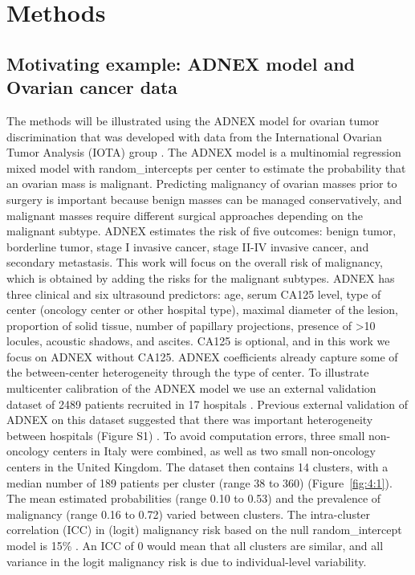 \section{Methods}
\subsection{\texorpdfstring{Motivating example: ADNEX model and Ovarian cancer data}{Motivating example: ADNEX model and Ovarian cancer data}}
The methods will be illustrated using the \gls{ADNEX} model for ovarian tumor discrimination that was developed with data from the International Ovarian Tumor Analysis (\gls{IOTA}) group \cite{vancalsterEvaluatingRiskOvarian2014,timmerman2024}. The \gls{ADNEX} model is a multinomial regression mixed model with \glspl{random_intercept} per center to estimate the probability that an ovarian mass is malignant. Predicting malignancy of ovarian masses prior to surgery is important because benign masses can be managed conservatively, and malignant masses require different surgical approaches depending on the malignant subtype. \gls{ADNEX} estimates the risk of five outcomes: benign tumor, borderline tumor, stage I invasive cancer, stage II-IV invasive cancer, and secondary metastasis. This work will focus on the overall risk of malignancy, which is obtained by adding the risks for the malignant subtypes. \gls{ADNEX} has three clinical and six ultrasound predictors: age, serum \gls{CA125} level, type of center (oncology center or other hospital type), maximal diameter of the lesion, proportion of solid tissue, number of papillary projections, presence of \textgreater10 locules, acoustic shadows, and ascites. \gls{CA125} is optional, and in this work we focus on \gls{ADNEX} without \gls{CA125}. \gls{ADNEX} coefficients already capture some of the between-center heterogeneity through the type of center. To illustrate multicenter calibration of the \gls{ADNEX} model we use an external validation dataset of 2489 patients recruited in 17 hospitals \cite{kaijserEvidencebasedApproachDiagnosis2015}. Previous external validation of \gls{ADNEX} on this dataset suggested that there was important heterogeneity between hospitals (Figure S1) \cite{vancalsterValidationModelsDiagnose2020}. To avoid computation errors, three small non-oncology centers in Italy were combined, as well as two small non-oncology centers in the United Kingdom. The dataset then contains 14 clusters, with a median number of 189 patients per cluster (range 38 to 360) (Figure~\ref{fig:4:1}). The mean estimated probabilities (range 0.10 to 0.53) and the prevalence of malignancy (range 0.16 to 0.72) varied between clusters. The intra-cluster correlation (\gls{ICC}) in (logit) malignancy risk based on the null \gls{random_intercept} model is 15\% \cite{snijdersMultilevelAnalysisIntroduction2012}. An \gls{ICC} of 0 would mean that all clusters are similar, and all variance in the logit malignancy risk is due to individual-level variability.


